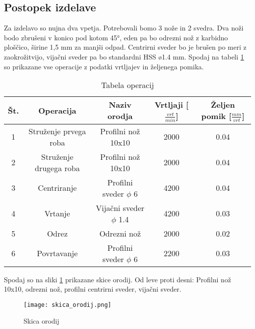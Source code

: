 \subsection{Postopek izdelave}
Za izdelavo so nujna dva vpetja. Potrebovali bomo 3 nože in 2 
svedra. Dva noži bodo zbrušeni v konico pod kotom 45°, eden pa 
bo odrezni nož z karbidno ploščico, širine 1,5 mm za manjši odpad. 
Centrirni sveder bo je brušen po meri z zaokrožitvijo, vijačni 
sveder pa bo standardni HSS ø1.4 mm. Spodaj na tabeli \ref{tabela_operacij}
so prikazane vse operacije z podatki vrtljajev in željenega pomika.

\begin{table}[H]
    \caption{Tabela operacij}
    \label{tabela_operacij}
    \begin{center}
        \begin{tabular}{|c|c|c|c|c|}
            \hline
            Št. & Operacija & Naziv orodja & Vrtljaji [\( \frac{vrt}{min}\)] & Željen pomik [\( \frac{mm}{vrt}\)] \\
            \hline
            1 & Struženje prvega roba & Profilni nož 10x10 & 2000 & 0.04 \\
            \hline
            2 & Struženje drugega roba & Profilni nož 10x10 & 2000 & 0.04 \\
            \hline
            3 & Centriranje & Profilni sveder $\phi$ 6 & 4200 & 0.04 \\
            \hline
            4 & Vrtanje & Vijačni sveder $\phi$ 1.4 & 4200 & 0.03 \\
            \hline
            5 & Odrez & Odrezni nož & 2000 & 0.02 \\
            \hline
            6 & Povrtavanje & Profilni sveder $\phi$ 6 & 2200 & 0.03 \\
            \hline
        \end{tabular}
    \end{center}
    
\end{table}

Spodaj so na sliki \ref{skica_orodij} prikazane skice orodij.  Od leve proti desni: Profilni nož 10x10,
odrezni nož, profilni centrirni sveder, vijačni sveder.
\begin{figure}[H]
    \begin{center}
        \texttt{[image: skica\_orodij.png]}
        \caption{Skica orodij
        \cite{lasten}}
        \label{skica_orodij}
    \end{center}
\end{figure}

